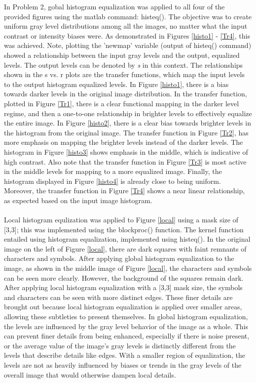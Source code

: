 \documentclass[./rarnold_report2.tex]{subfiles}
\begin{document}
\noindent In Problem 2, gobal histogram equalization was applied to all four of the provided figures using the matlab command: histeq().  The objective was to create uniform gray level distributions among all the images, no matter what the input contrast or intensity biases were.  As demonstrated in Figures \ref{histo1} - \ref{Tr4}, this was achieved.  Note, plotting the 'newmap' variable (output of histeq() command) showed a relationship between the input gray levels and the output, equalized levels. The output levels can be denoted by \textit{s} in this context.  The relationships shown in the s vs. r plots are the transfer functions, which map the input levels to the output histogram equalized levels. In Figure \ref{histo1}, there is a bias towards darker levels in the original image distribution.  In the transfer function, plotted in Figure \ref{Tr1}, there is a clear functional mapping in the darker level regime, and then a one-to-one relationship in brighter levels to effectively equalize the entire image.  In Figure \ref{histo2}, there is a clear bias towards brighter levels in the histogram from the original image.  The transfer function in Figure \ref{Tr2}, has more emphasis on mapping the brighter levels instead of the darker levels.  The histogram in Figure \ref{histo3} shows emphasis in the middle, which is indicative of high contrast.  Also note that the transfer function in Figure \ref{Tr3} is most active in the middle levels for mapping to a more equalized image.  Finally, the histogram displayed in Figure \ref{histo4} is already close to being uniform.  Moreover, the transfer function in Figure \ref{Tr4} shows a near linear relationship, as expected based on the input image histogram.
\\ \\
\noindent Local histogram equlization was applied to Figure \ref{local} using a mask size of [3,3]; this was implemented using the blockproc() function.  The kernel function entailed using histogram equalization, implemented using histeq().  In the original image on the left of Figure \ref{local}, there are dark squares with faint remnants of characters and symbols.  After applying global histogram equalization to the image, as shown in the middle image of Figure \ref{local}, the characters and symbols can be seen more clearly. However, the background of the squares remain dark.  After applying local histogram equalization with a [3,3] mask size, the symbols and characters can be seen with more distinct edges.  These finer details are brought out because local histogram equalization is applied over smaller areas, allowing these subtleties to present themselves.  In global histogram equalization, the levels are influenced by the gray level behavior of the image as a whole.  This can prevent finer details from being enhanced, especially if there is noise present, or the average value of the image's gray levels is distinctly different from the levels that describe details like edges.  With a smaller region of equalization, the levels are not as heavily influenced by biases or trends in the gray levels of the overall image that would otherwise dampen local details.  
\clearpage
\end{document}
